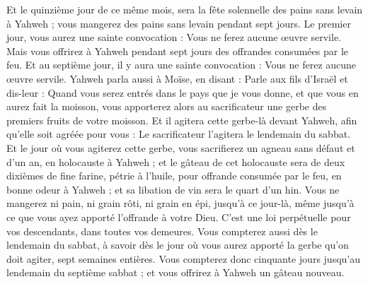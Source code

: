 \begin{multicols}{2}
Et le quinzième jour de ce même mois, sera la fête solennelle des pains sans levain à Yahweh ; vous mangerez des pains sans levain pendant sept jours.
Le premier jour, vous aurez une sainte convocation : Vous ne ferez aucune œuvre servile.
Mais vous offrirez à Yahweh pendant sept jours des offrandes consumées par le feu. Et au septième jour, il y aura une sainte convocation : Vous ne ferez aucune œuvre servile.
Yahweh parla aussi à Moïse, en disant :
Parle aux fils d'Israël et dis-leur : Quand vous serez entrés dans le pays que je vous donne, et que vous en aurez fait la moisson, vous apporterez alors au sacrificateur une gerbe des premiers fruits de votre moisson.
Et il agitera cette gerbe-là devant Yahweh, afin qu'elle soit agréée pour vous : Le sacrificateur l'agitera le lendemain du sabbat.
Et le jour où vous agiterez cette gerbe, vous sacrifierez un agneau sans défaut et d'un an, en holocauste à Yahweh ;
et le gâteau de cet holocauste sera de deux dixièmes de fine farine, pétrie à l'huile, pour offrande consumée par le feu, en bonne odeur à Yahweh ; et sa libation de vin sera le quart d'un hin.
Vous ne mangerez ni pain, ni grain rôti, ni grain en épi, jusqu'à ce jour-là, même jusqu'à ce que vous ayez apporté l'offrande à votre Dieu. C'est une loi perpétuelle pour vos descendants, dans toutes vos demeures.
Vous compterez aussi dès le lendemain du sabbat, à savoir dès le jour où vous aurez apporté la gerbe qu'on doit agiter, sept semaines entières.
Vous compterez donc cinquante jours jusqu'au lendemain du septième sabbat ; et vous offrirez à Yahweh un gâteau nouveau.

\end{multicols}
